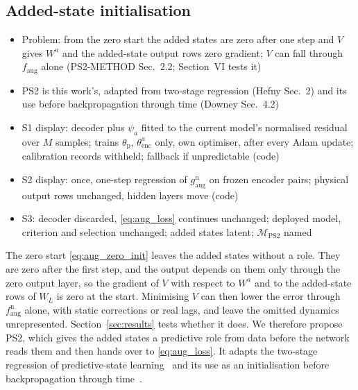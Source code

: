 \subsection{Added-state initialisation}\label{sec:aug_ps2}
\ifdraft
\begin{itemize}
\item Problem: from the zero start the added states are zero after one step and $V$ gives $W^a$ and the added-state output rows zero gradient; $V$ can fall through $f_{\mathrm{aug}}$ alone (PS2-METHOD Sec.~2.2; Section~VI tests it)
\item PS2 is this work's, adapted from two-stage regression (Hefny Sec.~2) and its use before backpropagation through time (Downey Sec.~4.2)
\item S1 display: decoder plus $\psi_a$ fitted to the current model's normalised residual over $M$ samples; trains $\theta_{\mathrm p}$, $\theta^a_{\mathrm{enc}}$ only, own optimiser, after every Adam update; calibration records withheld; fallback if unpredictable (code)
\item S2 display: once, one-step regression of $g^{\mathrm n}_{\mathrm{aug}}$ on frozen encoder pairs; physical output rows unchanged, hidden layers move (code)
\item S3: decoder discarded, \eqref{eq:aug_loss} continues unchanged; deployed model, criterion and selection unchanged; added states latent; $\mathcal M_{\mathrm{PS2}}$ named
\end{itemize}
\fi

The zero start \eqref{eq:aug_zero_init} leaves the added states without a
role.
They are zero after the first step, and the output depends on them only
through the zero output layer, so the gradient of $V$ with respect to $W^a$
and to the added-state rows of $W_L$ is zero at the start.
Minimising $V$ can then lower the error through $f^{\mathrm n}_{\mathrm{aug}}$
alone, with static corrections or real lags, and leave the omitted dynamics
unrepresented.
Section~\ref{sec:results} tests whether it does.
We therefore propose PS2, which gives the added states a predictive role from
data before the network reads them and then hands over to \eqref{eq:aug_loss}.
It adapts the two-stage regression of predictive-state
learning~\cite[Sec.~2]{hefny2015supervised} and its use as an initialisation
before backpropagation through time~\cite[Sec.~4.2]{downey2017psrnn}.

